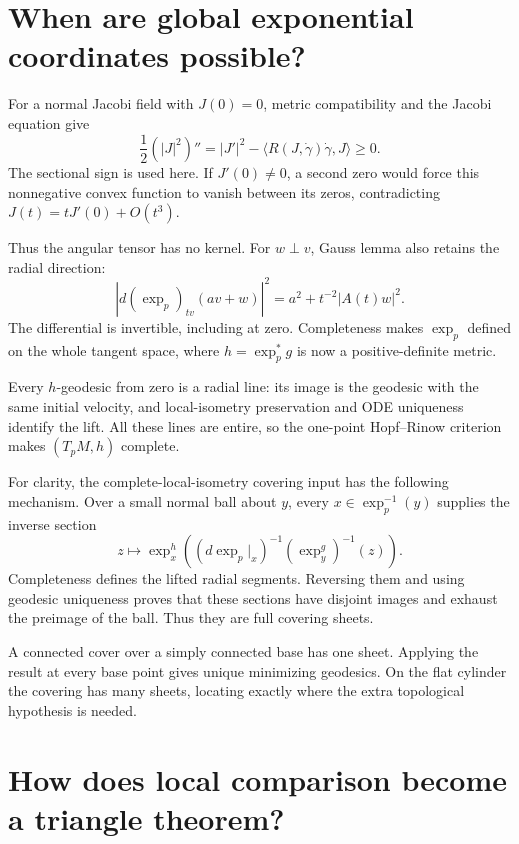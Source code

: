 \documentclass[12pt,reqno]{amsart}
\begin{document}
\section{When are global exponential coordinates possible?}
\label{sec:hadamard}

\begin{samepage}
\begin{theorem}
\label{thm:hadamard}

\end{theorem}
\end{samepage}

For a normal Jacobi field with \(J(0)=0\), metric compatibility and the Jacobi equation give
\[
\frac12(|J|^2)''=|J'|^2-\langle R(J,\dot\gamma)\dot\gamma,J\rangle\ge0.
\]
The sectional sign is used here. If \(J'(0)\ne0\), a second zero would force this nonnegative convex function to vanish between its zeros, contradicting \(J(t)=tJ'(0)+O(t^3)\).

Thus the angular tensor has no kernel. For \(w\perp v\), Gauss lemma also retains the radial direction:
\[
|d(\exp_p)_{tv}(av+w)|^2=a^2+t^{-2}|A(t)w|^2.
\]
The differential is invertible, including at zero. Completeness makes \(\exp_p\) defined on the whole tangent space, where \(h=\exp_p^*g\) is now a positive-definite metric.

Every \(h\)-geodesic from zero is a radial line: its image is the geodesic with the same initial velocity, and local-isometry preservation and ODE uniqueness identify the lift. All these lines are entire, so the one-point Hopf--Rinow criterion makes \((T_pM,h)\) complete.

For clarity, the complete-local-isometry covering input has the following mechanism. Over a small normal ball about \(y\), every \(x\in\exp_p^{-1}(y)\) supplies the inverse section
\[
z\longmapsto\exp_x^h\left((d\exp_p|_x)^{-1}(\exp_y^g)^{-1}(z)\right).
\]
Completeness defines the lifted radial segments. Reversing them and using geodesic uniqueness proves that these sections have disjoint images and exhaust the preimage of the ball. Thus they are full covering sheets.

A connected cover over a simply connected base has one sheet. Applying the result at every base point gives unique minimizing geodesics. On the flat cylinder the covering has many sheets, locating exactly where the extra topological hypothesis is needed.

\section{How does local comparison become a triangle theorem?}
\label{sec:toponogov}
\end{document}
